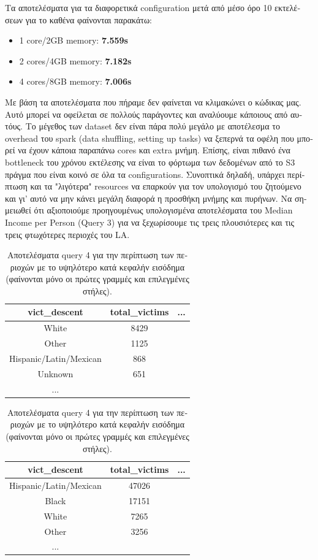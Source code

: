 \documentclass[a4paper,12pt]{article}
\begin{document}
\begin{otherlanguage}{greek}
Τα αποτελέσματα για τα διαφορετικά configuration μετά από μέσο όρο 10 εκτελέσεων για το καθένα φαίνονται παρακάτω:
\begin{itemize}
	\item 1 core/2GB memory: \textbf{7.559s}
	\item 2 cores/4GB memory: \textbf{7.182s}
	\item 4 cores/8GB memory: \textbf{7.006s}
\end{itemize}
Με βάση τα αποτελέσματα που πήραμε δεν φαίνεται να κλιμακώνει ο κώδικας μας. Αυτό μπορεί να οφείλεται σε πολλούς παράγοντες και αναλύουμε κάποιους από αυτόυς. Το μέγεθος των dataset δεν είναι πάρα πολύ μεγάλο με αποτέλεσμα το overhead του spark (data shuffling, setting up tasks) να ξεπερνά τα οφέλη που μπορεί να έχουν κάποια παραπάνω cores και extra μνήμη. Επίσης, είναι πιθανό ένα bottleneck του χρόνου εκτέλεσης να είναι το φόρτωμα των δεδομένων από το S3 πράγμα που είναι κοινό σε όλα τα configurations. Συνοπτικά δηλαδή, υπάρχει περίπτωση και τα "λιγότερα" resources να επαρκούν για τον υπολογισμό του ζητούμενο και γι' αυτό να μην κάνει μεγάλη διαφορά η προσθήκη μνήμης και πυρήνων.
\vspace{0.2cm}
Να σημειωθεί ότι αξιοποιούμε προηγουμένως υπολογισμένα αποτελέσματα του Median Income per Person (Query 3) για να ξεχωρίσουμε τις τρεις πλουσιότερες και τις τρεις φτωχότερες περιοχές του LA.
	\begin{table}[h]
		\centering
		\begin{tabular}{ccc}
			vict\_descent & total\_victims & ... \\
			\hline
			White & 8429 & \\
			Other & 1125 & \\
			Hispanic/Latin/Mexican & 868 & \\
			Unknown & 651 & \\
			...
		\end{tabular}
		\caption{Aποτελέσματα query 4 για την περίπτωση των
		περιοχών με το υψηλότερο κατά κεφαλήν εισόδημα 
		(φαίνονται μόνο οι 
		πρώτες γραμμές και επιλεγμένες στήλες).}
	\end{table}
	\FloatBarrier

	\begin{table}[h]
		\centering
		\begin{tabular}{ccc}
			vict\_descent & total\_victims & ... \\
			\hline
			Hispanic/Latin/Mexican & 47026 & \\
			Black & 17151 & \\
			White & 7265 & \\
			Other & 3256 & \\
			...
		\end{tabular}
		\caption{Aποτελέσματα query 4 για την περίπτωση των
		περιοχών με το υψηλότερο κατά κεφαλήν εισόδημα 
		(φαίνονται μόνο οι 
		πρώτες γραμμές και επιλεγμένες στήλες).}
	\end{table}
	\FloatBarrier
\newpage

\end{otherlanguage}
\end{document}
